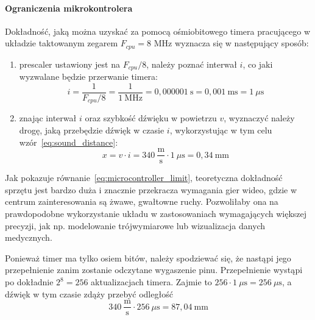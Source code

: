 \paragraph{Ograniczenia mikrokontrolera}
\label{section:microcontroller_limit}

Dokładność, jaką można uzyskać za pomocą ośmiobitowego timera pracującego w układzie taktowanym zegarem $F_{cpu} = 8$ MHz wyznacza się w następujący sposób:
\begin{enumerate}
 \item {}prescaler ustawiony jest na $F_{cpu}/8$, należy poznać interwał $i$, co jaki wyzwalane będzie przerwanie timera:
    \begin{equation}
      i = \frac{1}{F_{cpu}/8} = \frac{1}{1~\textrm{MHz}} = 0,000001~\textrm{s} = 0,001~\textrm{ms} = 1~\mu\textrm{s}
      \label{eq:sampling_frequency}
    \end{equation}

 \item znając interwał $i$ oraz szybkość dźwięku w powietrzu $v$, wyznaczyć należy drogę, jaką przebędzie dźwięk w czasie $i$, wykorzystując w tym celu wzór~\ref{eq:sound_distance}:
    \begin{equation}
      x = v \cdot i = 340~\frac{\textrm{m}}{\textrm{s}} \cdot 1~\mu\textrm{s} = 0,34~\textrm{mm}
      \label{eq:microcontroller_limit}
    \end{equation}
\end{enumerate}

Jak pokazuje równanie~\ref{eq:microcontroller_limit}, teoretyczna dokładność sprzętu jest bardzo duża i znacznie przekracza wymagania gier wideo, gdzie w centrum zainteresowania są żwawe, gwałtowne ruchy. Pozwoliłaby ona na prawdopodobne wykorzystanie układu w zastosowaniach wymagających większej precyzji, jak np. modelowanie trójwymiarowe lub wizualizacja danych medycznych.

Ponieważ timer ma tylko osiem bitów, należy spodziewać się, że nastąpi jego przepełnienie zanim zostanie odczytane wygaszenie pinu. Przepełnienie wystąpi po dokładnie $2^8 = 256$ aktualizacjach timera. Zajmie to $256 \cdot 1~\mu\textrm{s} = 256~\mu\textrm{s}$, a dźwięk w tym czasie zdąży przebyć odległość 
\begin{equation}
 340~\frac{\textrm{m}}{\textrm{s}} \cdot 256~\mu\textrm{s} = 87,04~\textrm{mm}
\end{equation}


